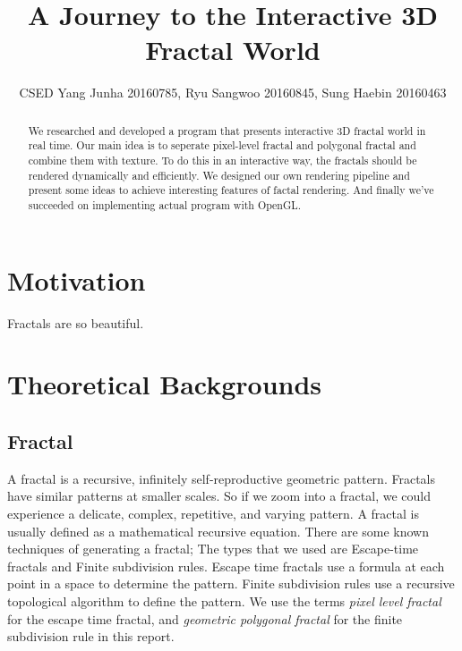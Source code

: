 \documentclass[a4paper]{article}
\title{A Journey to the Interactive 3D Fractal World}
\author{CSED Yang Junha 20160785, Ryu Sangwoo 20160845, Sung Haebin 20160463}
\begin{document}
\maketitle
\begin{abstract}
We researched and developed a program that presents interactive 3D fractal world in real time.
Our main idea is to seperate pixel-level fractal and polygonal fractal and combine them with texture.
To do this in an interactive way, the fractals should be rendered dynamically and efficiently.
We designed our own rendering pipeline and present some ideas to achieve interesting features of factal rendering.
And finally we've succeeded on implementing actual program with OpenGL.
\end{abstract}
\section{Motivation}
Fractals are so beautiful.


\section{Theoretical Backgrounds}
\subsection{Fractal}
A fractal is a recursive, infinitely self-reproductive geometric pattern. 
Fractals have similar patterns at smaller scales. 
So if we zoom into a fractal, we could experience a delicate, complex, repetitive, and varying pattern. 
A fractal is usually defined as a mathematical recursive equation. 
There are some known techniques of generating a fractal; 
The types that we used are Escape-time fractals and Finite subdivision rules. 
Escape time fractals use a formula at each point in a space to determine the pattern. 
Finite subdivision rules use a recursive topological algorithm to define the pattern. 
We use the terms \textit{pixel level fractal} for the escape time fractal, and \textit{geometric polygonal fractal} for the finite subdivision rule in this report. 
\end{document}

